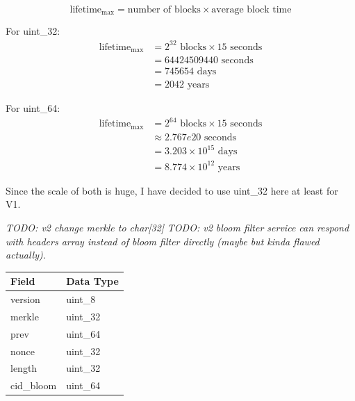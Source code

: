 \documentclass{article}
\begin{document}
\[\textrm{lifetime}_\textrm{max} = \textrm{number of blocks} \times \textrm{average block time}\]

For uint\_32:
\begin{align*}
    \textrm{lifetime}_\textrm{max} &= 2^{32} \textrm{ blocks} \times 15 \textrm{ seconds} \\
    &= 64424509440 \textrm{ seconds} \\
    &= 745654 \textrm{ days} \\
    &= 2042 \textrm{ years}
\end{align*}

For uint\_64:
\begin{align*}
    \textrm{lifetime}_\textrm{max} &= 2^{64} \textrm{ blocks} \times 15 \textrm{ seconds} \\
    &\approx 2.767e20 \textrm{ seconds} \\
    &= 3.203{\times}10^{15} \textrm{ days} \\
    &= 8.774{\times}10^{12} \textrm{ years}
\end{align*}

Since the scale of both is huge, I have decided to use uint\_32 here at least for V1.

\textit{TODO: v2 change merkle to char[32]}
\textit{TODO: v2 bloom filter service can respond with headers array instead of bloom filter directly (maybe but kinda flawed actually).}


\begin{table}[h]
\centering
\begin{tabular}{|l|l|}
\hline
\rowcolor{tblgrey} 
Field           & Data Type \\ \hline
version         & uint\_8   \\ \hline
merkle          & uint\_32  \\ \hline
prev            & uint\_64  \\ \hline
nonce           & uint\_32  \\ \hline
length          & uint\_32  \\ \hline
cid\_bloom      & uint\_64  \\ \hline
\end{tabular}
\end{table}

\clearpage
\printbibliography
\end{document}
